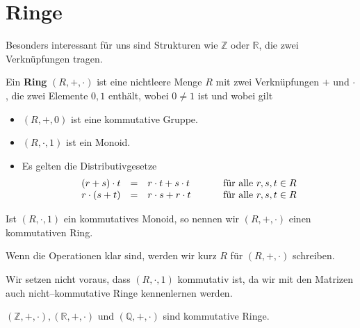 \section{Ringe}\label{section_gruppe}

Besonders interessant für uns sind Strukturen wie $\mathbb Z$ oder $\mathbb R$, die zwei Verknüpfungen 
tragen. 

\begin{definition} Ein \textbf{Ring} $(R, + , \cdot)$ ist eine nichtleere Menge $R$ mit 
zwei Verknüpfungen $+$ und 
$\cdot$, die zwei Elemente $0, 1$ enthält, wobei $0 \neq 1$ ist und wobei gilt

  \begin{itemize}
  \item $(R, +, 0)$ ist eine kommutative Gruppe.
  \item $(R, \cdot, 1)$ ist ein Monoid.
  \item Es gelten die Distributivgesetze
  $$ \begin{array} {l c l c l}
    (r + s) \cdot t & = & r \cdot t + s \cdot t & \quad & \textrm{ für alle } r, s, t \in R \\
    r \cdot (s + t) & = & r \cdot s + r \cdot t & \quad & \textrm{ für alle } r, s, t \in R
  \end{array} $$
 \end{itemize}
  
Ist $(R, \cdot, 1)$ ein kommutatives Monoid, so nennen wir $(R, + , \cdot)$ einen kommutativen Ring.
\end{definition}

\begin{notiz} Wenn die Operationen klar sind, werden wir kurz $R$ für $(R, + , \cdot)$ schreiben.
\end{notiz}

\begin{notiz} Wir setzen nicht voraus, dass $(R, \cdot, 1)$ kommutativ ist, da wir mit den Matrizen 
auch nicht--kommutative Ringe kennenlernen werden.
\end{notiz}

\begin{beispiel} $(\mathbb Z, +, \cdot), (\mathbb R, +, \cdot)$ und $(\mathbb Q, +, \cdot)$ sind kommutative 
Ringe.
\end{beispiel}

